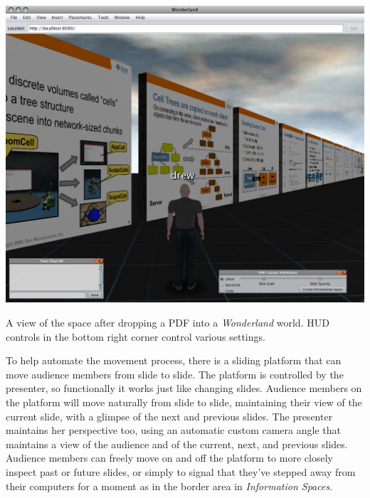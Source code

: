 \begin{marginfigure}
	\includegraphics{figures/pdf-spreader.png}
	\caption{A view of the space after dropping a PDF into a \emph{Wonderland} world. HUD controls in the bottom right corner control various settings.}
	\label{fig:pdf_spreader}
\end{marginfigure}


To help automate the movement process, there is a sliding platform that can move audience members from slide to slide. The platform is controlled by the presenter, so functionally it works just like changing slides.  Audience members on the platform will move naturally from slide to slide, maintaining their view of the current slide, with a glimpse of the next and previous slides. The presenter maintains her perspective too, using an automatic custom camera angle that maintains a view of the audience and of the current, next, and previous slides. Audience members can freely move on and off the platform to more closely inspect past or future slides, or simply to signal that they've stepped away from their computers for a moment as in the border area in \emph{Information Spaces}. 

